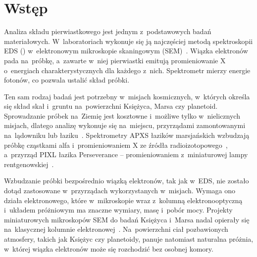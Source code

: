 \chapter{Wstęp}
\label{ch:wstep}

Analiza składu pierwiastkowego jest jednym z~podstawowych badań
materiałowych. W~laboratoriach wykonuje się ją najczęściej metodą
spektroskopii EDS ()
w~elektronowym mikroskopie skaningowym (SEM)~\cite{goldstein2018sem}.
Wiązka elektronów pada na~próbkę, a~zawarte w~niej pierwiastki emitują
promieniowanie X o~energiach charakterystycznych dla każdego z~nich.
Spektrometr mierzy energie fotonów, co pozwala ustalić skład próbki.

Ten sam rodzaj badań jest potrzebny w~misjach kosmicznych, w~których
określa się skład skał i~gruntu na~powierzchni Księżyca, Marsa czy
planetoid. Sprowadzanie próbek na~Ziemię jest kosztowne i~możliwe tylko
w~nielicznych misjach, dlatego analizę wykonuje się na~miejscu,
przyrządami zamontowanymi na~lądowniku lub łaziku~\cite{gellert2015apxs}.
Spektrometry APXS łazików marsjańskich wzbudzają próbkę cząstkami alfa
i~promieniowaniem X ze źródła radioizotopowego~\cite{rieder2003apxs},
a~przyrząd PIXL łazika Perseverance -- promieniowaniem z~miniaturowej
lampy rentgenowskiej~\cite{allwood2020pixl}.

Wzbudzanie próbki bezpośrednio wiązką elektronów, tak jak w~EDS, nie
zostało dotąd zastosowane w~przyrządach wykorzystanych w~misjach.
Wymaga ono działa elektronowego, które w~mikroskopie wraz z~kolumną
elektronooptyczną i~układem próżniowym ma znaczne wymiary, masę i~pobór
mocy. Projekty miniaturowych mikroskopów SEM do badań Księżyca i~Marsa
nadal opierały się na~klasycznej kolumnie elektronowej~\cite{gaskin2012mvpsem}.
Na~powierzchni ciał pozbawionych atmosfery, takich jak Księżyc czy
planetoidy, panuje natomiast naturalna próżnia, w~której wiązka
elektronów może się rozchodzić bez osobnej komory.

